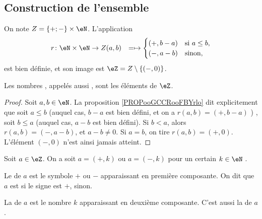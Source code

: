 \subsection{Construction de l'ensemble}
\label{SUBooEntiersConstruction}
\begin{propositionDef}	\label{PROPooDEFEntiersRelatifsSoustraction}
	On note \( Z = \{ +; - \} \times \eN \). L'application
 	\begin{equation}
  		\begin{aligned}
			r \colon \eN \times \eN &\to Z
   				(a,b) &= \mapsto   \begin{cases}
						            (+, b-a) & \text{si }  a\leq b,\\
						            (-, a-b) & \text{sinon,}
					               \end{cases}
		\end{aligned}
  	\end{equation}
    est bien définie, et son image est \( \eZ = Z \setminus\{(-,0)\} \).
	
 	Les nombres , appelés aussi  , sont les éléments de \( \eZ \).
\end{propositionDef}

\begin{proof}
	Soit \( a, b \in \eN \). La proposition \ref{PROPooGCCRooFBYrlo} dit explicitement que soit \( a \leq b \) (auquel cas, \( b - a \) est bien défini, et on a \( r(a,b) = (+, b-a) \) ) , soit \( b \leq a \) (auquel cas, \( a - b \) est bien défini). Si \( b < a \), alors \( r(a,b) = (-, a-b) \), et \( a - b \neq 0 \). Si \( a = b \), on tire \( r(a,b) = (+, 0) \). L'élément \( (-,0) \) n'est ainsi jamais atteint.
\end{proof}

\begin{definition}	\label{DEFooEntiersRelatifsSigneDistance}
	Soit \( a \in \eZ \). On a soit \( a = (+,k) \) ou \( a = (-, k) \) pour un certain \( k \in \eN \).

 	Le  de \( a \) est le symbole \( + \) ou \( - \) apparaissant en première composante. On dit que \( a \) est  si le signe est \( + \),  sinon.

  	La  de \( a \) est le nombre \( k \) apparaissant en deuxième composante. C'est aussi la  de \( a \).
\end{definition}

